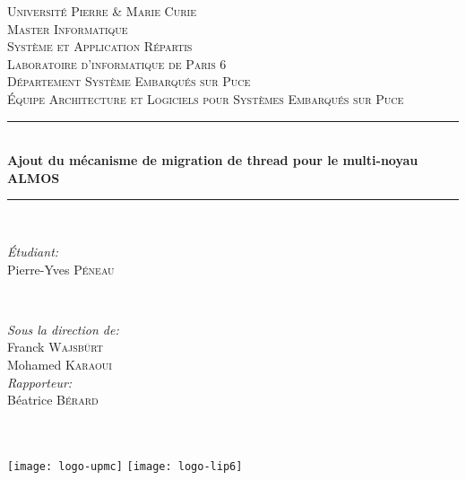 \begin{titlepage}

\newcommand{\HRule}{\rule{\linewidth}{0.44mm}}
\center


\textsc{\LARGE Université Pierre \& Marie Curie}\\[0.44cm]
\textsc{\Large Master Informatique}\\[0.44cm]
\textsc{\large Système et Application Répartis}\\[1.44cm]

\textsc{\LARGE Laboratoire d'informatique de Paris 6}\\[0.44cm]
\textsc{\Large Département Système Embarqués sur Puce}\\[0.44cm]
\textsc{\large Équipe Architecture et Logiciels pour Systèmes Embarqués sur
  Puce}\\[1.44cm]

\HRule \\[0.4cm] { \huge
  \bfseries Ajout du mécanisme de migration de thread pour le multi-noyau
  ALMOS}\\[0.4cm]
\HRule \\[1.44cm]


\begin{minipage}{0.4\textwidth}
\begin{flushleft} \large
\emph{Étudiant:}\\ Pierre-Yves \textsc{Péneau}
\end{flushleft}
\end{minipage}
~
\begin{minipage}{0.4\textwidth}
\begin{flushright} \large
  \emph{Sous la direction de:} \\ Franck \textsc{Wajsbürt}\\ Mohamed
  \textsc{Karaoui}\\\vspace{1.44cm} \emph{Rapporteur:} \\ Béatrice
  \textsc{Bérard}
\end{flushright}
\end{minipage}\\[2cm]


\\[1cm]


\texttt{[image: logo-upmc]}\hspace{3cm}
\texttt{[image: logo-lip6]}\\[1cm]
\vfill

\end{titlepage}
